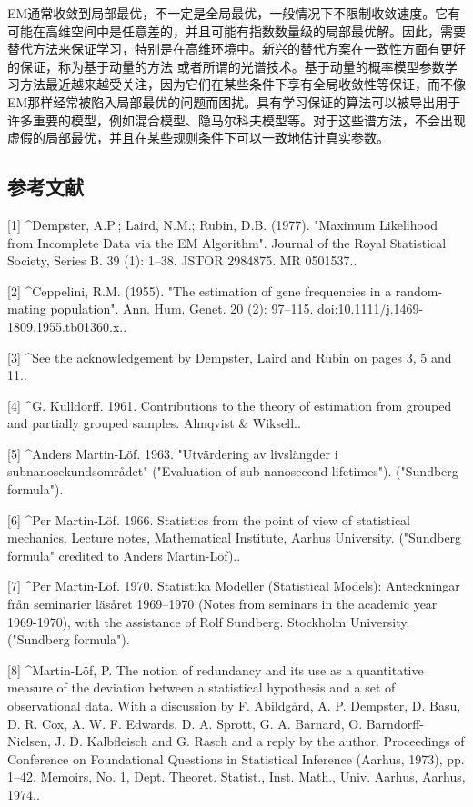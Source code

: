 EM通常收敛到局部最优，不一定是全局最优，一般情况下不限制收敛速度。它有可能在高维空间中是任意差的，并且可能有指数数量级的局部最优解。因此，需要替代方法来保证学习，特别是在高维环境中。新兴的替代方案在一致性方面有更好的保证，称为基于动量的方法 或者所谓的光谱技术。基于动量的概率模型参数学习方法最近越来越受关注，因为它们在某些条件下享有全局收敛性等保证，而不像EM那样经常被陷入局部最优的问题而困扰。具有学习保证的算法可以被导出用于许多重要的模型，例如混合模型、隐马尔科夫模型等。对于这些谱方法，不会出现虚假的局部最优，并且在某些规则条件下可以一致地估计真实参数。

\subsection{参考文献}

[1]
^Dempster, A.P.; Laird, N.M.; Rubin, D.B. (1977). "Maximum Likelihood from Incomplete Data via the EM Algorithm". Journal of the Royal Statistical Society, Series B. 39 (1): 1–38. JSTOR 2984875. MR 0501537..

[2]
^Ceppelini, R.M. (1955). "The estimation of gene frequencies in a random-mating population". Ann. Hum. Genet. 20 (2): 97–115. doi:10.1111/j.1469-1809.1955.tb01360.x..

[3]
^See the acknowledgement by Dempster, Laird and Rubin on pages 3, 5 and 11..

[4]
^G. Kulldorff. 1961. Contributions to the theory of estimation from grouped and partially grouped samples. Almqvist & Wiksell..

[5]
^Anders Martin-Löf. 1963. "Utvärdering av livslängder i subnanosekundsområdet" ("Evaluation of sub-nanosecond lifetimes"). ("Sundberg formula").

[6]
^Per Martin-Löf. 1966. Statistics from the point of view of statistical mechanics. Lecture notes, Mathematical Institute, Aarhus University. ("Sundberg formula" credited to Anders Martin-Löf)..

[7]
^Per Martin-Löf. 1970. Statistika Modeller (Statistical Models): Anteckningar från seminarier läsåret 1969–1970 (Notes from seminars in the academic year 1969-1970), with the assistance of Rolf Sundberg. Stockholm University. ("Sundberg formula").

[8]
^Martin-Löf, P. The notion of redundancy and its use as a quantitative measure of the deviation between a statistical hypothesis and a set of observational data. With a discussion by F. Abildgård, A. P. Dempster, D. Basu, D. R. Cox, A. W. F. Edwards, D. A. Sprott, G. A. Barnard, O. Barndorff-Nielsen, J. D. Kalbfleisch and G. Rasch and a reply by the author. Proceedings of Conference on Foundational Questions in Statistical Inference (Aarhus, 1973), pp. 1–42. Memoirs, No. 1, Dept. Theoret. Statist., Inst. Math., Univ. Aarhus, Aarhus, 1974..

